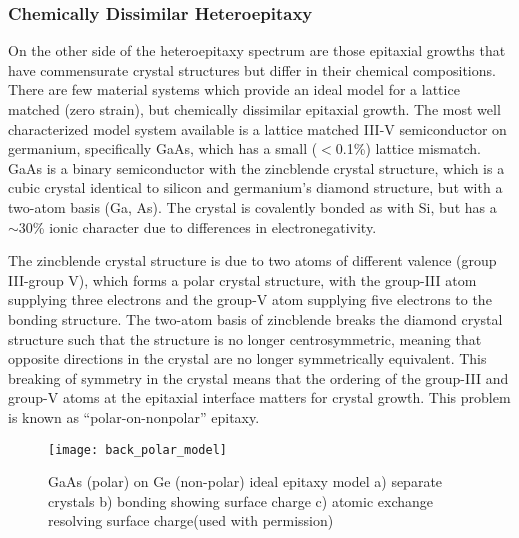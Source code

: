\subsubsection{Chemically Dissimilar Heteroepitaxy} On the other side of the heteroepitaxy spectrum are those epitaxial growths that have commensurate crystal structures but differ in their chemical compositions.
There are few material systems which provide an ideal model for a lattice matched (zero strain), but chemically dissimilar epitaxial growth.
The most well characterized model system available is a lattice matched III-V semiconductor on germanium, specifically GaAs, which has a small (\(<\)0.1\%) lattice mismatch.
GaAs is a binary semiconductor with the zincblende crystal structure, which is a cubic crystal identical to silicon and germanium's diamond structure, but with a two-atom basis (Ga, As).
The crystal is covalently bonded as with Si, but has a \(\sim\)30\% ionic character due to differences in electronegativity\cite{Christensen1987}.

The zincblende crystal structure is due to two atoms of different valence (group III-group V), which forms a polar crystal structure, with the group-III atom supplying three electrons and the group-V atom supplying five electrons to the bonding structure.
The two-atom basis of zincblende breaks the diamond crystal structure such that the structure is no longer centrosymmetric, meaning that opposite directions in the crystal are no longer symmetrically equivalent.
This breaking of symmetry in the crystal means that the ordering of the group-III and group-V atoms at the epitaxial interface matters for crystal growth.
This problem is known as ``polar-on-nonpolar'' epitaxy\cite{Biegelsen1992,Kroemer1987}.
\begin{figure}
 \centering \texttt{[image: back\_polar\_model]}
 \caption[Atomic model of polar on non-polar epitaxy]{\label{fig:back_polar_model}GaAs (polar) on Ge (non-polar) ideal epitaxy model a) separate crystals b) bonding showing surface charge c) atomic exchange resolving surface charge\cite{Biegelsen1992}(used with permission)}
\end{figure}

